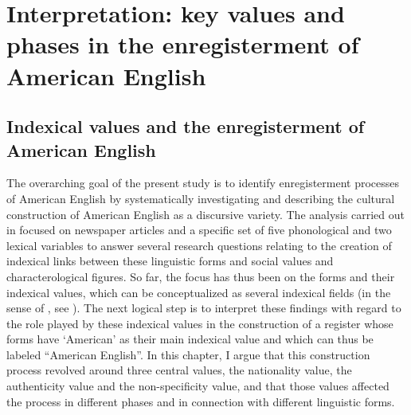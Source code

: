 \chapter[Interpretation]{Interpretation: key values and phases in the enregisterment of American English}
\label{bkm:Ref532290015}\hypertarget{Toc63021245}{}\section{Indexical values and the enregisterment of American English}
\hypertarget{Toc63021246}{}
The overarching goal of the present study is to identify enregisterment processes of American English by systematically investigating and describing the cultural construction of American English as a discursive variety. The analysis carried out in  focused on newspaper articles and a specific set of five phonological and two lexical variables to answer several research questions relating to the creation of indexical links between these linguistic forms and social values and characterological figures. So far, the focus has thus been on the forms and their indexical values, which can be conceptualized as several indexical fields (in the sense of \citealt{Eckert2008}, see ). The next logical step is to interpret these findings with regard to the role played by these indexical values in the construction of a register whose forms have ‘American’ as their main indexical value and which can thus be labeled “American English”. In this chapter, I argue that this construction process revolved around three central values, the nationality value, the authenticity value and the non-specificity value, and that those values affected the process in different phases and in connection with different linguistic forms.


